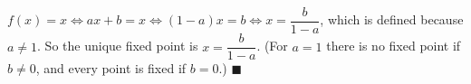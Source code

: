 $f(x)=x\iff ax+b=x\iff(1-a)x=b\iff x=\dfrac{b}{1-a}$, which is defined because $a\ne1$. So the unique fixed point is $x=\dfrac b{1-a}$. (For $a=1$ there is no fixed point if $b\ne0$, and every point is fixed if $b=0$.) $\blacksquare$
